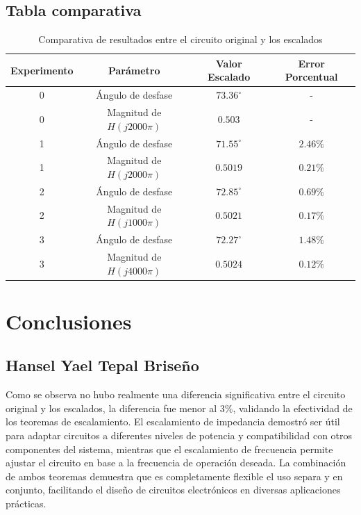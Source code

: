 \documentclass[12pt, letterpaper]{article}
\begin{document}
\subsection*{Tabla comparativa}

\begin{table}[H]
	\centering
	\begin{tabular}{|c|c|c|c|}
		\hline
		\textbf{Experimento} & \textbf{Parámetro} & \textbf{Valor Escalado} & \textbf{Error Porcentual} \\
		\hline
		0 & Ángulo de desfase & \(73.36^{\circ}\) & - \\
		\hline
		0 & Magnitud de \(H(j2000\pi)\) & \(0.503\) & - \\
		\hline
		1 & Ángulo de desfase & \(71.55^{\circ}\) & \(2.46\%\) \\
		\hline
		1 & Magnitud de \(H(j2000\pi)\) & \(0.5019\) & \(0.21\%\) \\
		\hline
		2 & Ángulo de desfase & \(72.85^{\circ}\) & \(0.69\%\) \\
		\hline
		2 & Magnitud de \(H(j1000\pi)\) & \(0.5021\) & \(0.17\%\) \\
		\hline
		3 & Ángulo de desfase & \(72.27^{\circ}\) & \(1.48\%\) \\
		\hline
		3 & Magnitud de \(H(j4000\pi)\) & \(0.5024\) & \(0.12\%\) \\
		\hline
	\end{tabular}
	\caption{Comparativa de resultados entre el circuito original y los escalados}
	\label{tab:comparativa_resultados}
\end{table}

\section{Conclusiones}

\subsection*{Hansel Yael Tepal Briseño}

Como se observa no hubo realmente una diferencia significativa entre el circuito original y los escalados, la diferencia fue menor al 3\%, validando la efectividad de los teoremas de escalamiento. El escalamiento de impedancia demostró ser útil para adaptar circuitos a diferentes niveles de potencia y compatibilidad con otros componentes del sistema, mientras que el escalamiento de frecuencia permite ajustar el circuito en base a la frecuencia de operación deseada. La combinación de ambos teoremas demuestra que es completamente flexible el uso separa y en conjunto, facilitando el diseño de circuitos electrónicos en diversas aplicaciones prácticas.
\end{document}
